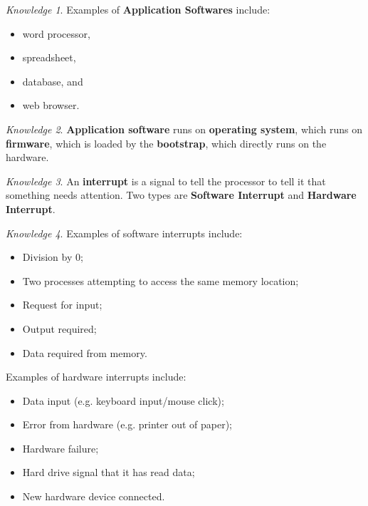 \documentclass[8pt]{article}
\theoremstyle{remark}
\newtheorem{knowledge}{Knowledge}[subsection]
\begin{document}
            \begin{knowledge}
                Examples of \textbf{Application Softwares} include:
                \begin{itemize}
                    \item word processor,
                    \item spreadsheet,
                    \item database, and
                    \item web browser.
                \end{itemize}
            \end{knowledge}

            \begin{knowledge}
                \textbf{Application software} runs on \textbf{operating system}, which runs on \textbf{firmware}, which is loaded by the \textbf{bootstrap}, which directly runs on the hardware. 
            \end{knowledge}

            \begin{knowledge}
                An \textbf{interrupt} is a signal to tell the processor to tell it that something needs attention. Two types are \textbf{Software Interrupt} and \textbf{Hardware Interrupt}.
            \end{knowledge}

            \begin{knowledge}
                Examples of software interrupts include:
                \begin{itemize}
                    \item Division by 0;
                    \item Two processes attempting to access the same memory location;
                    \item Request for input;
                    \item Output required;
                    \item Data required from memory.
                \end{itemize}

                Examples of hardware interrupts include:
                \begin{itemize}
                    \item Data input (e.g. keyboard input/mouse click);
                    \item Error from hardware (e.g. printer out of paper);
                    \item Hardware failure;
                    \item Hard drive signal that it has read data;
                    \item New hardware device connected.
                \end{itemize}
            \end{knowledge}
\end{document}

